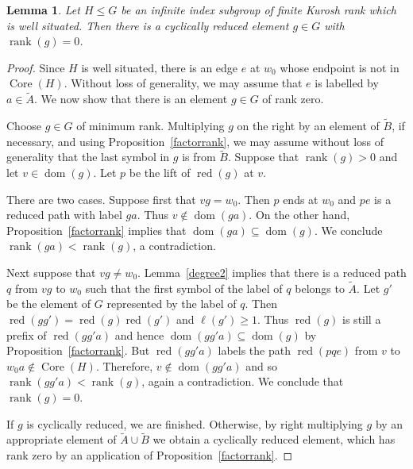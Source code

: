 \documentclass[11pt,reqno]{amsart}
\newtheorem{Lemma}[Thm]{Lemma}
\begin{document}
\begin{Lemma}\label{rank0}
Let $H\leq G$ be an infinite index subgroup of finite Kurosh rank which is well situated.  Then there is a cyclically reduced element $g\in G$ with ${\mathop{\mathrm{rank}}}(g)=0$.
\end{Lemma}
\begin{proof}
Since $H$ is well situated, there is an edge $e$ at $w_0$ whose endpoint is not in ${\mathop{\mathrm{Core}}\nolimits}(H)$.  Without loss of generality, we may assume that $e$ is labelled by $a\in {\ensuremath{\widetilde {A}}}$.  We now show that there is an element $g\in G$ of rank zero.

Choose $g\in G$ of minimum rank.  Multiplying $g$ on the right by an element of ${\ensuremath{\widetilde {B}}}$, if necessary, and using Proposition~\ref{factorrank}, we may assume without loss of generality that the last symbol in $g$ is from ${\ensuremath{\widetilde {B}}}$.  Suppose that ${\mathop{\mathrm{rank}}}(g)>0$ and let $v\in {\mathop{\mathrm {dom}}\nolimits}(g)$. Let $p$ be the lift of ${\mathop{\mathrm{red}}\nolimits}(g)$ at $v$.

There are two cases.  Suppose first that $vg=w_0$.  Then $p$ ends at $w_0$ and $pe$ is a reduced path with label $ga$.  Thus $v\notin {\mathop{\mathrm {dom}}\nolimits}(ga)$.  On the other hand, Proposition~\ref{factorrank} implies that ${\mathop{\mathrm {dom}}\nolimits}(ga)\subseteq {\mathop{\mathrm {dom}}\nolimits}(g)$.  We conclude ${\mathop{\mathrm{rank}}}(ga)<{\mathop{\mathrm{rank}}}(g)$, a contradiction.

Next suppose that $vg\neq w_0$.  Lemma~\ref{degree2} implies that there is a reduced path $q$ from $vg$ to $w_0$ such that the first symbol of the label of $q$ belongs to ${\ensuremath{\widetilde {A}}}$. Let $g'$ be the element of $G$ represented by the label of $q$.  Then ${\mathop{\mathrm{red}}\nolimits}(gg')={\mathop{\mathrm{red}}\nolimits}(g){\mathop{\mathrm{red}}\nolimits}(g')$ and $\ell(g')\geq 1$.  Thus ${\mathop{\mathrm{red}}\nolimits}(g)$ is still a prefix of ${\mathop{\mathrm{red}}\nolimits}(gg'a)$ and hence ${\mathop{\mathrm {dom}}\nolimits}(gg'a)\subseteq {\mathop{\mathrm {dom}}\nolimits}(g)$ by Proposition~\ref{factorrank}.   But ${\mathop{\mathrm{red}}\nolimits}(gg'a)$ labels the path ${\mathop{\mathrm{red}}\nolimits}(pqe)$ from $v$ to $w_0a\notin {\mathop{\mathrm{Core}}\nolimits}(H)$. Therefore, $v\notin {\mathop{\mathrm {dom}}\nolimits}(gg'a)$ and  so ${\mathop{\mathrm{rank}}}(gg'a)<{\mathop{\mathrm{rank}}}(g)$, again a contradiction.  We conclude that ${\mathop{\mathrm{rank}}}(g)=0$.

If $g$ is cyclically reduced, we are finished.  Otherwise, by right multiplying $g$ by an appropriate element of ${\ensuremath{\widetilde {A}}}\cup {\ensuremath{\widetilde {B}}}$ we obtain a cyclically reduced element, which has rank zero by an application of Proposition~\ref{factorrank}.
\end{proof}
\end{document}
